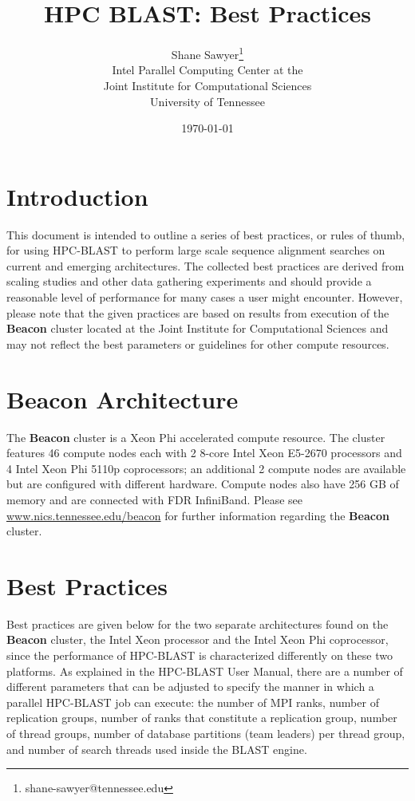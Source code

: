 \documentclass[10pt]{article}
\newcommand{\beac}{\textbf{Beacon }}
\begin{document}
\title{HPC BLAST: Best Practices\\
         }
\author{Shane Sawyer\thanks{shane-sawyer@tennessee.edu}\\
   Intel Parallel Computing Center at the\\
   Joint Institute for Computational Sciences\\University of Tennessee}
\date{\today}
\maketitle

\section{Introduction} \label{sec:intro}

This document is intended to outline a series of best practices, or rules of thumb, for using HPC-BLAST to perform large scale sequence alignment
searches on current and emerging architectures.  The collected best practices are derived from scaling studies and other data gathering experiments and
should provide a reasonable level of performance for many cases a user might encounter.  However, please note that the given practices are based on
results from execution of the \beac cluster located at the Joint Institute for Computational Sciences and may not reflect the best parameters or guidelines
for other compute resources.

\section{\beac Architecture} \label{sec:beacon-arch}

The \beac cluster is a Xeon Phi accelerated compute resource.  The cluster features 46 compute nodes each with 2 8-core Intel Xeon E5-2670 processors
and 4 Intel Xeon Phi 5110p coprocessors; an additional 2 compute nodes are available but are configured with different hardware.  Compute nodes also
have 256 GB of memory and are connected with FDR InfiniBand.  Please see \url{www.nics.tennessee.edu/beacon} for further information regarding the \beac cluster.

\section{Best Practices} \label{sec:best-prac}

Best practices are given below for the two separate architectures found on the \beac cluster, the Intel Xeon processor and the Intel Xeon Phi coprocessor,
since the performance of HPC-BLAST is characterized differently on these two platforms.  As explained
in the HPC-BLAST User Manual, there are a number of different parameters that can be adjusted to specify the manner in which a parallel HPC-BLAST job
can execute: the number of MPI ranks, number of replication groups, number of ranks that constitute a replication group, number of thread groups, number
of database partitions (team leaders) per thread group, and number of search threads used inside the BLAST engine.\\
\end{document}

